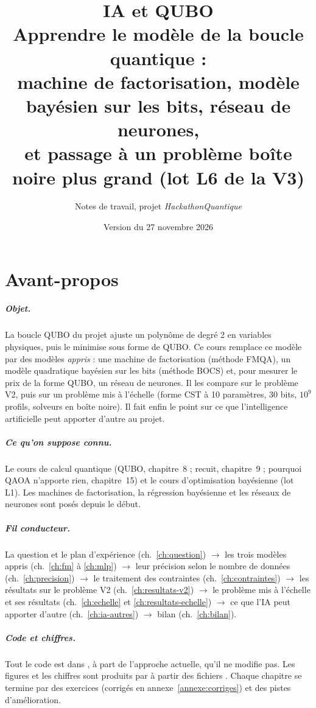 \documentclass[11pt,a4paper]{report}
\title{\textbf{IA et QUBO}\\[0.4em]\large Apprendre le modèle de la boucle quantique :\\ machine de factorisation, modèle bayésien sur les bits, réseau de neurones,\\ et passage à un problème boîte noire plus grand (lot L6 de la V3)}
\author{Notes de travail, projet \emph{HackathonQuantique}}
\date{Version du 27 novembre 2026}
\begin{document}
\maketitle
{}

\chapter*{Avant-propos}
\paragraph{Objet.} La boucle QUBO du projet ajuste un polynôme de degré 2 en variables physiques, puis le minimise sous forme de QUBO. Ce cours remplace ce modèle par des modèles \emph{appris} : une machine de factorisation (méthode FMQA), un modèle quadratique bayésien sur les bits (méthode BOCS) et, pour mesurer le prix de la forme QUBO, un réseau de neurones. Il les compare sur le problème V2, puis sur un problème mis à l'échelle (forme CST à 10 paramètres, 30 bits, $10^9$ profils, solveurs en boîte noire). Il fait enfin le point sur ce que l'intelligence artificielle peut apporter d'autre au projet.

\paragraph{Ce qu'on suppose connu.} Le cours de calcul quantique (QUBO, chapitre~8 ; recuit, chapitre~9 ; pourquoi QAOA n'apporte rien, chapitre~15) et le cours d'optimisation bayésienne (lot L1). Les machines de factorisation, la régression bayésienne et les réseaux de neurones sont posés depuis le début.

\paragraph{Fil conducteur.} La question et le plan d'expérience (ch.~\ref{ch:question}) $\to$ les trois modèles appris (ch.~\ref{ch:fm} à \ref{ch:mlp}) $\to$ leur précision selon le nombre de données (ch.~\ref{ch:precision}) $\to$ le traitement des contraintes (ch.~\ref{ch:contraintes}) $\to$ les résultats sur le problème V2 (ch.~\ref{ch:resultats-v2}) $\to$ le problème mis à l'échelle et ses résultats (ch.~\ref{ch:echelle} et \ref{ch:resultats-echelle}) $\to$ ce que l'IA peut apporter d'autre (ch.~\ref{ch:ia-autres}) $\to$ bilan (ch.~\ref{ch:bilan}).

\paragraph{Code et chiffres.} Tout le code est dans , à part de l'approche actuelle, qu'il ne modifie pas. Les figures et les chiffres sont produits par  à partir des fichiers . Chaque chapitre se termine par des exercices (corrigés en annexe~\ref{annexe:corriges}) et des pistes d'amélioration.
\end{document}
